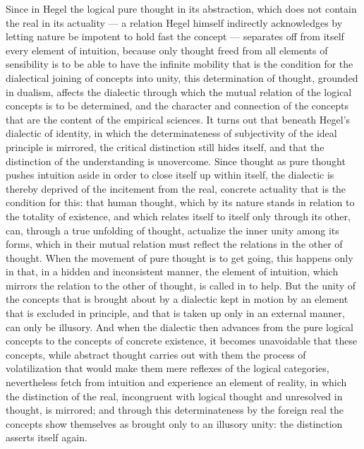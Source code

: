 Since in Hegel the logical pure thought in its abstraction, which does
not contain the real in its actuality --- a relation Hegel himself
indirectly acknowledges by letting nature be impotent to hold fast the
concept --- separates off from itself every element of intuition,
because only thought freed from all elements of sensibility is to be
able to have the infinite mobility that is the condition for the
dialectical joining of concepts into unity, this determination of
thought, grounded in dualism, affects the dialectic through which the
mutual relation of the logical concepts is to be determined, and the
character and connection of the concepts that are the content of the
empirical sciences. It turns out that beneath Hegel's dialectic of
identity, in which the determinateness of subjectivity of the ideal
principle is mirrored, the critical distinction still hides itself, and
that the distinction of the understanding is unovercome. Since thought
as pure thought pushes intuition aside in order to close itself up
within itself, the dialectic is thereby deprived of the incitement from
the real, concrete actuality that is the condition for this: that human thought,
which by its nature stands in relation to the totality of existence, and
which relates itself to itself only through its other, can,
through a true unfolding of thought, actualize the inner unity among
its forms, which in their mutual relation must reflect the relations in
the other of thought. When the movement of pure thought is to get
going, this happens only in that, in a hidden and inconsistent manner,
the element of intuition, which mirrors the relation to the other of
thought, is called in to help. But the unity of the concepts
that is brought about by a dialectic kept in motion by an element that
is excluded in principle, and that is taken up only in an external
manner, can only be illusory. And when the dialectic then advances from
the pure logical concepts to the concepts of concrete existence, it
becomes unavoidable that these concepts, while abstract thought carries
out with them the process of volatilization that would make them mere
reflexes of the logical categories, nevertheless fetch from intuition
and experience an element of reality, in which the distinction of the
real, incongruent with logical thought and unresolved in thought, is
mirrored; and through this determinateness by the foreign real the
concepts show themselves as brought only to an illusory unity: the
distinction asserts itself again.

